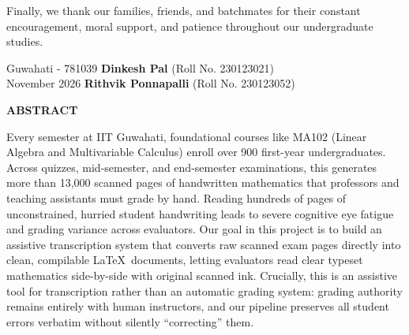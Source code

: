 \documentclass[12pt,a4paper]{report}
\theoremstyle{plain}
\theoremstyle{definition}
\theoremstyle{remark}
\begin{document}
\vspace{0.4cm}
\noindent
Finally, we thank our families, friends, and batchmates for their constant encouragement, moral support, and patience throughout our undergraduate studies.

\vspace{1.5cm}
\noindent Guwahati - 781039 \hfill \textbf{Dinkesh Pal} (Roll No. 230123021) \\
\noindent November 2026 \hfill \textbf{Rithvik Ponnapalli} (Roll No. 230123052)

\clearpage

\begin{center}
{\Large{\bf{ABSTRACT}}}
\end{center}
\vspace{0.3cm}

Every semester at IIT Guwahati, foundational courses like MA102 (Linear Algebra and Multivariable Calculus) enroll over 900 first-year undergraduates. Across quizzes, mid-semester, and end-semester examinations, this generates more than 13,000 scanned pages of handwritten mathematics that professors and teaching assistants must grade by hand. Reading hundreds of pages of unconstrained, hurried student handwriting leads to severe cognitive eye fatigue and grading variance across evaluators. Our goal in this project is to build an assistive transcription system that converts raw scanned exam pages directly into clean, compilable \LaTeX\ documents, letting evaluators read clear typeset mathematics side-by-side with original scanned ink. Crucially, this is an assistive tool for transcription rather than an automatic grading system: grading authority remains entirely with human instructors, and our pipeline preserves all student errors verbatim without silently ``correcting'' them.
\end{document}
